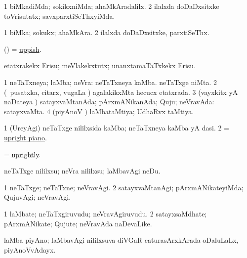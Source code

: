 \bentry
{}
\gl{\kirxvi}
\bmng
\bnum
\num{1} biMkadiMda; sokikxniMda; ahaMkAradalilx. 
\num{2} ilalxda doDaDxsitxke toVrisutatx; savxparxtiSeThxyiMda. 
\enum
\emng
\eentry

\bentry
{} 
\gl{\nA}
\expl{}
\bmng
\bnum
\num{1} biMka; sokukx; ahaMkAra. 
\num{2} ilalxda doDaDxsitxke, parxtiSeThx. 
\enum
\emng
\eentry

\bentry
{} 
\gl{\gu}
\expl{}
\bmng
(\AmA) = \hyperlink{uppish}{uppish}. 
\emng
\eentry

\bentry
{} 
\gl{\sakirx}
\expl{}
\bmng
etatxrakekx Erisu; meVlakekxtutx; unanxtamaTaTxkekx Erisu. 
\emng
\eentry

\bentry
{} 
\gl{\gu}
\expl{}
\bmng
\bnum
\num{1} neTaTxneya; laMba; neVra:  neTaTxneya kaMba.  neTaTxge niMta. 
\num{2} (\kanmu\ pusatxka, citarx, \mo vugaLa \vi) agalakikxMta hecucx etatxrada. 
\num{3} (vayxkitx yA naDateya \vi) satayxvaMtanAda; pArxmANikanAda; Quju; neVravAda:  satayxvaMta. 
\num{4} (piyAnoV \vi) laMbataMtiya; UdhaRvx taMtiya. 
\enum
\emng
\eentry

\bentry
{} 
\gl{\nA}
\expl{}
\bmng
\bnum
\num{1} (UreyAgi) neTaTxge nililxsida kaMba; neTaTxneya kaMba yA dasi. 
\num{2} = \hyperlink{upright piano}{upright piano}. 
\enum
\emng
\eentry

\bentry
{} 
\gl{\kirxvi}
\expl{}
\bmng
= \hyperlink{uprightly}{uprightly}. 
\emng
\eentry

\bentry
{} 
\gl{\sakirx}
\expl{}
\bmng
neTaTxge nililxsu; neVra nililxsu; laMbavAgi neDu. 
\emng
\eentry

\bentry
{} 
\gl{\kirxvi}
\expl{}
\bmng
\bnum
\num{1} neTaTxge; neTaTxne; neVravAgi. 
\num{2} satayxvaMtanAgi; pArxmANikateyiMda; QujuvAgi; neVravAgi. 
\enum
\emng
\eentry

\bentry
{} 
\gl{\nA}
\expl{}
\bmng
\bnum
\num{1} laMbate; neTaTxgiruvudu; neVravAgiruvudu. 
\num{2} satayxsaMdhate; pArxmANikate; Qujute; neVravAda naDevaLike. 
\enum
\emng
\eentry

\bentry
{}
\gl{\nA}
\expl{}
\bmng
laMba piyAno; laMbavAgi nililxsuva diVGaR caturasArxkArada oDaluLaLx, piyAnoVvAdayx. 
\emng
\eentry

